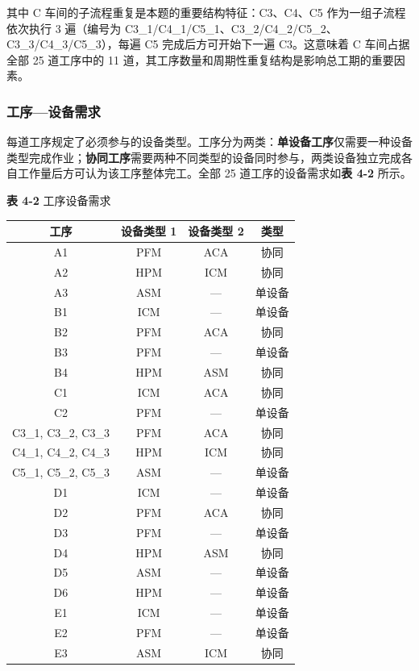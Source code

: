 \documentclass[UTF8,a4paper,12pt]{ctexart}
\begin{document}
其中 C 车间的子流程重复是本题的重要结构特征：C3、C4、C5 作为一组子流程依次执行 3 遍（编号为 C3\_1/C4\_1/C5\_1、C3\_2/C4\_2/C5\_2、C3\_3/C4\_3/C5\_3），每遍 C5 完成后方可开始下一遍 C3。这意味着 C 车间占据全部 25 道工序中的 11 道，其工序数量和周期性重复结构是影响总工期的重要因素。

\subsubsection{工序—设备需求}
每道工序规定了必须参与的设备类型。工序分为两类：\textbf{单设备工序}仅需要一种设备类型完成作业；\textbf{协同工序}需要两种不同类型的设备同时参与，两类设备独立完成各自工作量后方可认为该工序整体完工。全部 25 道工序的设备需求如\textbf{表 4-2} 所示。

\begin{center}
\textbf{表 4-2} 工序设备需求
\begin{tabular}{cccc}
\toprule
工序 & 设备类型 1 & 设备类型 2 & 类型 \\
\midrule
A1 & PFM & ACA & 协同 \\
A2 & HPM & ICM & 协同 \\
A3 & ASM & — & 单设备 \\
B1 & ICM & — & 单设备 \\
B2 & PFM & ACA & 协同 \\
B3 & PFM & — & 单设备 \\
B4 & HPM & ASM & 协同 \\
C1 & ICM & ACA & 协同 \\
C2 & PFM & — & 单设备 \\
C3\_1, C3\_2, C3\_3 & PFM & ACA & 协同 \\
C4\_1, C4\_2, C4\_3 & HPM & ICM & 协同 \\
C5\_1, C5\_2, C5\_3 & ASM & — & 单设备 \\
D1 & ICM & — & 单设备 \\
D2 & PFM & ACA & 协同 \\
D3 & PFM & — & 单设备 \\
D4 & HPM & ASM & 协同 \\
D5 & ASM & — & 单设备 \\
D6 & HPM & — & 单设备 \\
E1 & ICM & — & 单设备 \\
E2 & PFM & — & 单设备 \\
E3 & ASM & ICM & 协同 \\
\bottomrule
\end{tabular}
\end{center}
\end{document}
